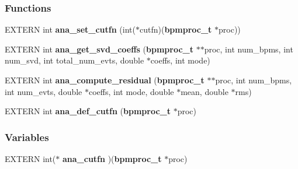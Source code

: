\subsubsection*{Functions}
\begin{CompactItemize}
\item 
EXTERN int {\bf ana\_\-set\_\-cutfn} (int($\ast$cutfn)({\bf bpmproc\_\-t} $\ast$proc))
\item 
EXTERN int {\bf ana\_\-get\_\-svd\_\-coeffs} ({\bf bpmproc\_\-t} $\ast$$\ast$proc, int num\_\-bpms, int num\_\-svd, int total\_\-num\_\-evts, double $\ast$coeffs, int mode)
\item 
EXTERN int {\bf ana\_\-compute\_\-residual} ({\bf bpmproc\_\-t} $\ast$$\ast$proc, int num\_\-bpms, int num\_\-evts, double $\ast$coeffs, int mode, double $\ast$mean, double $\ast$rms)
\item 
EXTERN int {\bf ana\_\-def\_\-cutfn} ({\bf bpmproc\_\-t} $\ast$proc)
\end{CompactItemize}
\subsubsection*{Variables}
\begin{CompactItemize}
\item 
EXTERN int($\ast$ {\bf ana\_\-cutfn} )({\bf bpmproc\_\-t} $\ast$proc)
\end{CompactItemize}
